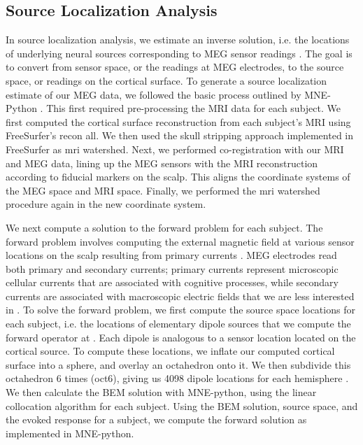 \documentclass[../main.tex]{subfiles}
\begin{document}
\subsection{Source Localization Analysis}
In source localization analysis, we estimate an inverse solution, i.e. the locations of underlying neural sources corresponding to MEG sensor readings \citep{mne}. The goal is to convert from sensor space, or the readings at MEG electrodes, to the source space, or readings on the cortical surface. To generate a source localization estimate of our MEG data, we followed the basic process outlined by MNE-Python \citep{mne}. This first required pre-processing the MRI data for each subject. We first computed the cortical surface reconstruction from each subject's MRI using FreeSurfer's recon all. We then used the skull stripping approach \citep{segonne_2004} implemented in FreeSurfer as mri watershed. Next, we performed co-registration with our MRI and MEG data, lining up the MEG sensors with the MRI reconstruction according to fiducial markers on the scalp. This aligns the coordinate systems of the MEG space and MRI space. Finally, we performed the mri watershed procedure again in the new coordinate system.

We next compute a solution to the forward problem for each subject. The forward problem involves computing the external magnetic field at various sensor locations on the scalp resulting from primary currents \citep{mosher99}. MEG electrodes read both primary and secondary currents; primary currents represent microscopic cellular currents that are associated with cognitive processes, while secondary currents are associated with macroscopic electric fields that we are less interested in \citep{mosher99}. To solve the forward problem, we first compute the source space locations for each subject, i.e. the locations of elementary dipole sources that we compute the forward operator at \cite{mne}. Each dipole is analogous to a sensor location located on the cortical source. To compute these locations, we inflate our computed cortical surface into a sphere, and overlay an octahedron onto it. We then subdivide this octahedron 6 times (oct6), giving us 4098 dipole locations for each hemisphere \cite{mne}. We then calculate the BEM solution with MNE-python, using the linear collocation algorithm \citep{mosher99, hamalainen89} for each subject. Using the BEM solution, source space, and the evoked response for a subject, we compute the forward solution as implemented in MNE-python.
\end{document}
